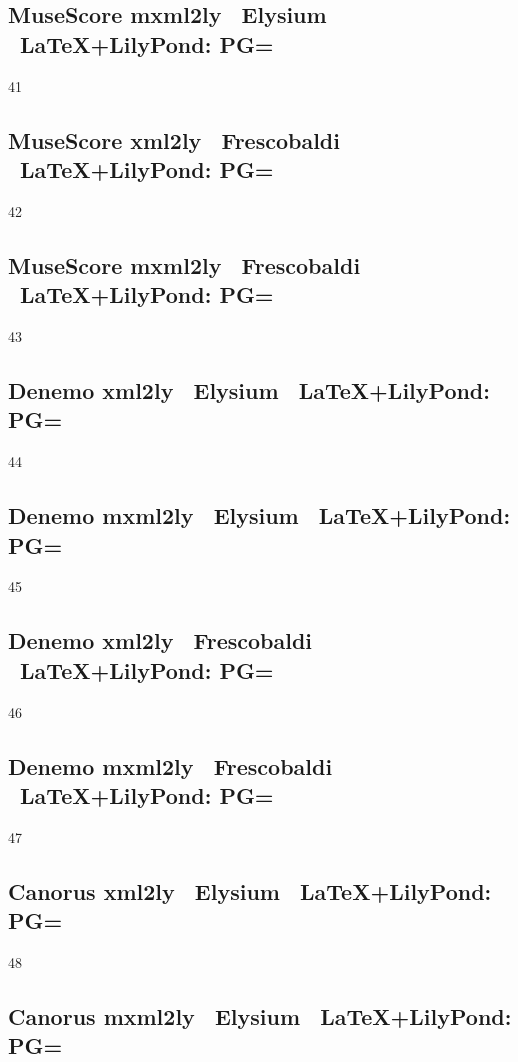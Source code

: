 \subsection{MuseScore \ra mxml2ly \ra\ Elysium \ra\ \LaTeX+LilyPond: PG=}

41

\subsection{MuseScore \ra xml2ly \ra\ Frescobaldi \ra\ \LaTeX+LilyPond: PG=} 

42

\subsection{MuseScore \ra mxml2ly \ra\ Frescobaldi \ra\ \LaTeX+LilyPond: PG=} 

43

\subsection{Denemo \ra xml2ly \ra\ Elysium \ra\ \LaTeX+LilyPond: PG=} 

44

\subsection{Denemo \ra mxml2ly \ra\ Elysium \ra\ \LaTeX+LilyPond: PG=} 

45

\subsection{Denemo \ra xml2ly \ra\ Frescobaldi \ra\ \LaTeX+LilyPond: PG=}

46

\subsection{Denemo \ra mxml2ly \ra\ Frescobaldi \ra\ \LaTeX+LilyPond: PG=}

47

\subsection{Canorus \ra xml2ly \ra\ Elysium \ra\ \LaTeX+LilyPond: PG=}

48

\subsection{Canorus \ra mxml2ly \ra\ Elysium \ra\ \LaTeX+LilyPond: PG=}

